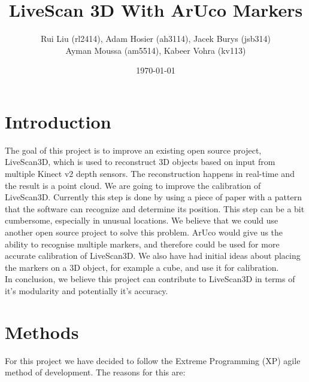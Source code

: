 \documentclass[a4paper,12pt]{article}
\title{LiveScan 3D With ArUco Markers}
\author{Rui Liu (rl2414), Adam Hosier (ah3114), Jacek Burys (jsb314)\\Ayman Moussa (am5514), Kabeer Vohra (kv113)}
\date{\today}
\begin{document}
\maketitle

\iffalse
The intent of this project is to introduce an improvement on an open source real time 3D reconstruction library, LiveScan3D (https://github.com/MarekKowalski/LiveScan3D).
LiveScan3D is a system designed for 3D reconstruction using multiple Kinect v2 depth sensors simultaneously in real time.
This library contains code for calibration of the relative postitions of different sensors. However, this part is a bit cumbersome.
The goal is to use another library, ArUco (http://www.uco.es/investiga/grupos/ava/node/26) to simplify, and potentually improve the accuracy of the calibration process. 
\fi

\section*{Introduction}

The goal of this project is to improve an existing open source project,
LiveScan3D, which is used to reconstruct 3D objects based on input from 
multiple Kinect v2 depth sensors. The reconstruction happens in real-time 
and the result is a point cloud. 
We are going to improve the calibration of LiveScan3D. Currently this step is
done by using a piece of paper with a pattern that the software can
recognize and determine its position. This step can be a bit cumbersome,
especially in unusual locations. 
We believe that we could use another open source project to solve this problem.
ArUco would give us the ability to recognise multiple markers, and therefore
could be used for more accurate calibration of LiveScan3D. We also have had
initial ideas about placing the markers on a 3D object, for example a cube,
and use it for calibration. \\

In conclusion, we believe this project can contribute to LiveScan3D in terms of
it's modularity and potentially it's accuracy.

\section*{Methods}
For this project we have decided to follow the Extreme Programming (XP) agile method of development. The reasons for this are:
\end{document}
